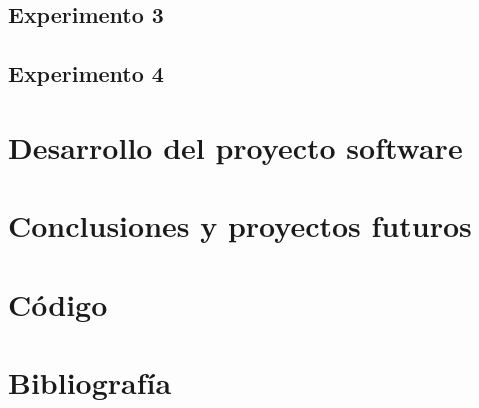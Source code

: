 \subsection{Experimento 3}
  
\subsection{Experimento 4}

\newpage

\section{Desarrollo del proyecto software}

\newpage

\section{Conclusiones y proyectos futuros} 

\newpage

\section{Código}

\newpage
\section{Bibliografía}







\appendix
\clearpage
\addappheadtotoc
\appendixpage



 


